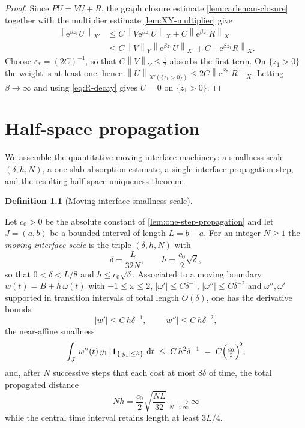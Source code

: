 \documentclass[11pt,oneside]{book}
\providecommand{\uses}[1]{}
\theoremstyle{definition}
\newtheorem{definition}[theorem]{Definition}
\theoremstyle{remark}
\newcommand{\1}{\mathbf 1}
\newcommand{\dd}{\,\mathrm d}
\newcommand{\norm}[1]{\left\lVert #1\right\rVert}
\newcommand{\e}{\mathrm e}
\newcommand{\eps}{\varepsilon}
\begin{document}
\begin{proof}
\uses{lem:carleman-closure, lem:XY-multiplier}
Since $PU=VU+R$, the graph closure estimate \cref{lem:carleman-closure} together with the
multiplier estimate \cref{lem:XY-multiplier} give
\begin{align*}
 \norm{\e^{\beta z_1}U}_{X'}
 &\le C\norm{V\e^{\beta z_1}U}_{X}+C\norm{\e^{\beta z_1}R}_{X}\\
 &\le C\norm V_Y\norm{\e^{\beta z_1}U}_{X'}+C\norm{\e^{\beta z_1}R}_{X}.
\end{align*}
Choose $\eps_*=(2C)^{-1}$, so that $C\norm V_Y\le\tfrac12$ absorbs the first term. On
$\{z_1>0\}$ the weight is at least one, hence
$\norm U_{X'(\{z_1>0\})}\le2C\norm{\e^{\beta z_1}R}_{X}$. Letting $\beta\to\infty$ and using
\eqref{eq:R-decay} gives $U=0$ on $\{z_1>0\}$.
\end{proof}


\chapter{Half-space propagation}\label{chap:halfspace}

We assemble the quantitative moving-interface machinery: a smallness scale $(\delta,h,N)$, a one-slab absorption estimate, a single interface-propagation step, and the resulting half-space uniqueness theorem.

\begin{definition}[Moving-interface smallness scale]\label{def:moving-interface-scale}
\uses{def:carleman-spaces}
Let $c_0>0$ be the absolute constant of \cref{lem:one-step-propagation} and let $J=(a,b)$ be a bounded interval of length $L=b-a$. For an integer $N\ge 1$ the \emph{moving-interface scale} is the triple $(\delta,h,N)$ with
\[
 \delta=\frac{L}{32N},
 \qquad
 h=\frac{c_0}{2}\sqrt\delta,
\]
so that $0<\delta<L/8$ and $h\le c_0\sqrt\delta$. Associated to a moving boundary $w(t)=B+h\,\omega(t)$ with $-1\le\omega\le2$, $|\omega'|\le C\delta^{-1}$, $|\omega''|\le C\delta^{-2}$ and $\omega'',\omega'$ supported in transition intervals of total length $O(\delta)$, one has the derivative bounds
\[
 |w'|\le C\,h\delta^{-1},
 \qquad
 |w''|\le C\,h\delta^{-2},
\]
the near-affine smallness
\[
 \int_J\bigl|w''(t)\,y_1\bigr|\,\1_{\{|y_1|\le h\}}\,\dd t
 \;\le\; C\,h^2\delta^{-1}
 \;=\; C\Bigl(\tfrac{c_0}2\Bigr)^{\!2},
\]
and, after $N$ successive steps that each cost at most $8\delta$ of time, the total propagated distance
\[
 Nh=\frac{c_0}{2}\sqrt{\frac{NL}{32}}\xrightarrow[N\to\infty]{}\infty
\]
while the central time interval retains length at least $3L/4$.
\end{definition}
\end{document}
